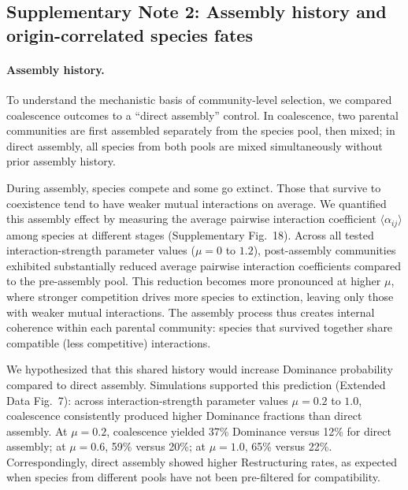\subsection*{Supplementary Note 2: Assembly history and origin-correlated species fates}
\label{sec:suppl:note2}

\paragraph{Assembly history.}
To understand the mechanistic basis of community-level selection, we compared coalescence outcomes to a ``direct assembly'' control. In coalescence, two parental communities are first assembled separately from the species pool, then mixed; in direct assembly, all species from both pools are mixed simultaneously without prior assembly history.

During assembly, species compete and some go extinct. Those that survive to coexistence tend to have weaker mutual interactions on average. We quantified this assembly effect by measuring the average pairwise interaction coefficient $\langle \alpha_{ij} \rangle$ among species at different stages (Supplementary Fig.~18). Across all tested interaction-strength parameter values ($\mu = 0$ to $1.2$), post-assembly communities exhibited substantially reduced average pairwise interaction coefficients compared to the pre-assembly pool. This reduction becomes more pronounced at higher $\mu$, where stronger competition drives more species to extinction, leaving only those with weaker mutual interactions. The assembly process thus creates internal coherence within each parental community: species that survived together share compatible (less competitive) interactions.

We hypothesized that this shared history would increase Dominance probability compared to direct assembly. Simulations supported this prediction (Extended Data Fig.~7): across interaction-strength parameter values $\mu = 0.2$ to $1.0$, coalescence consistently produced higher Dominance fractions than direct assembly. At $\mu = 0.2$, coalescence yielded 37\% Dominance versus 12\% for direct assembly; at $\mu = 0.6$, 59\% versus 20\%; at $\mu = 1.0$, 65\% versus 22\%. Correspondingly, direct assembly showed higher Restructuring rates, as expected when species from different pools have not been pre-filtered for compatibility.


